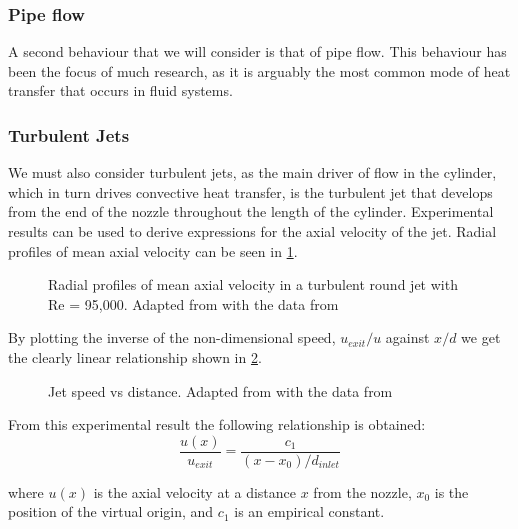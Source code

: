  
\subsubsection{Pipe flow}

A second behaviour that we will consider is that of pipe flow. This behaviour has been the focus of much research, as it is arguably the most common mode of heat transfer that occurs in fluid systems.

\subsubsection{Turbulent Jets}
\label{sec:turbulentJets}
We must also consider turbulent jets, as the main driver of flow in the cylinder, which in turn drives convective heat transfer, is the turbulent jet that develops from the end of the nozzle throughout the length of the cylinder. Experimental results can be used to derive expressions for the axial velocity of the jet. Radial profiles of  mean axial velocity can be seen in \cref{fig:radialProfile}.

\begin{figure}[h]
\begin{centering}
\caption{Radial profiles of mean axial velocity in a turbulent round jet with Re = 95,000. Adapted from \cite{pope2000} with the data from \cite{hussein1994}}
\label{fig:radialProfile}
\end{centering}
\end{figure}


\noindent By plotting the inverse of the non-dimensional speed, $u_{exit}/u$ against $x/d$ we get the clearly linear relationship shown in \cref{fig:jetSpeed}.

\begin{figure}[h]
\begin{centering}
\caption{Jet speed vs distance. Adapted from \cite{pope2000} with the data from \cite{hussein1994}}
\label{fig:jetSpeed}
\end{centering}
\end{figure}

\noindent From this experimental result the following relationship is obtained: 
\begin{equation}
\label{equ:axialSpeed}
\frac{u(x)}{u_{exit}} = \frac{c_1}{\left(x-x_0\right)/d_{inlet}}
\end{equation}

\noindent where $u(x)$ is the axial velocity at a distance $x$ from the nozzle, $x_0$ is the position of the virtual origin, and $c_1$ is an empirical constant.


